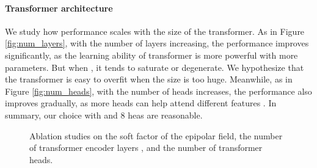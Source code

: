 \documentclass{bmvc2k}
\begin{document}
\vspace{-1.0 em}
\paragraph{Transformer architecture} We study how performance scales with the size of the transformer. As in Figure \ref{fig:num_layers}, with the number of layers  increasing, the performance improves significantly, as the learning ability of transformer is more powerful with more parameters. 
But when , it tends to saturate or degenerate. We hypothesize that the transformer is easy to overfit when the size is too huge. 
Meanwhile, as in Figure \ref{fig:num_heads},  with the number of heads increases, the performance also improves gradually, as more heads can help attend different features \cite{vaswani2017attention}.  
In summary, our choice with  and 8 heas are reasonable. 


\begin{figure}[h]
\centering  
{}
\vspace{-1.0em}
\caption{ \small{Ablation studies on the soft factor  of the epipolar field, the number of transformer encoder layers , and the number of transformer heads.}}
\vspace{-0.5em}
\end{figure}





\begin{table}[ht!]
\centering
{}
\vspace{-1em}
\caption{\footnotesize{2D and 3D pose estimation accuracy comparison on Ski-Pose.} }
\label{tab:skipose}
\end{table}
\end{document}
